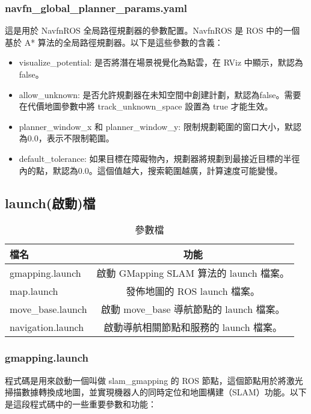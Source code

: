 \subsubsection{navfn\_global\_planner\_params.yaml}
這是用於 NavfnROS 全局路徑規劃器的參數配置。NavfnROS 是 ROS 中的一個基於 A* 算法的全局路徑規劃器。以下是這些參數的含義：

\begin{itemize}
    \item visualize\_potential: 是否將潛在場景視覺化為點雲，在 RViz 中顯示，默認為false。
    \item allow\_unknown: 是否允許規劃器在未知空間中創建計劃，默認為false。需要在代價地圖參數中將 track\_unknown\_space 設置為 true 才能生效。
    \item planner\_window\_x 和 planner\_window\_y: 限制規劃範圍的窗口大小，默認為0.0，表示不限制範圍。
    \item default\_tolerance: 如果目標在障礙物內，規劃器將規劃到最接近目標的半徑內的點，默認為0.0。這個值越大，搜索範圍越廣，計算速度可能變慢。
\end{itemize}


\subsection{launch(啟動)檔}
\begin{table}[ht]
\centering
\caption{參數檔}
\label{tab:nvlaunch}
\begin{tabular}{|l|c|}
\hline
\textbf{檔名} & \textbf{功能} \\
\hline
gmapping.launch & 啟動 GMapping SLAM 算法的 launch 檔案。\\
\hline
map.launch & 發佈地圖的 ROS launch 檔案。\\
\hline
move\_base.launch & 啟動 move\_base 導航節點的 launch 檔案。\\
\hline
navigation.launch &  啟動導航相關節點和服務的 launch 檔案。\\
\hline
\end{tabular}
\end{table}

\subsubsection{gmapping.launch}
程式碼是用來啟動一個叫做 slam\_gmapping 的 ROS 節點，這個節點用於將激光掃描數據轉換成地圖，並實現機器人的同時定位和地圖構建（SLAM）功能。以下是這段程式碼中的一些重要參數和功能：



